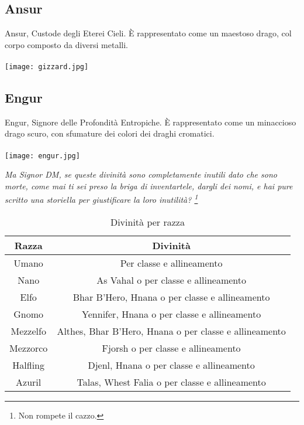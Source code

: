 \documentclass[a4paper]{report}
\begin{document}
\begin{multicols}{2}
\newpage
\subsection*{Ansur}
Ansur, Custode degli Eterei Cieli. È rappresentato come un maestoso drago, col corpo composto da diversi metalli.\\
\\
\texttt{[image: gizzard.jpg]}

\subsection*{Engur}
Engur, Signore delle Profondità Entropiche. È rappresentato come un minaccioso drago scuro, con sfumature dei colori dei draghi cromatici.\\
\\
\texttt{[image: engur.jpg]}

\vspace*{1cm}

\end{multicols}
\begin{tiny}
	\textsl{Ma Signor DM, se queste divinità sono completamente inutili dato che sono morte, come mai ti sei preso la briga di inventartele, dargli dei nomi, e hai pure scritto una storiella per giustificare la loro inutilità? \footnote{Non rompete il cazzo.}}\\
\end{tiny}

\vspace{1cm}
\begin{table}[h]
\centering
\begin{tabular}{||c|c||}
\hline
\bf	Razza & \bf Divinità\\
\hline
Umano & Per classe e allineamento\\
\hline
Nano & As Vahal o per classe e allineamento\\
\hline
Elfo & \quad \quad \quad \quad \quad \quad Bhar B'Hero, Hnana o per classe e allineamento \quad \quad \quad \quad \quad \quad\\
\hline
Gnomo & Yennifer, Hnana o per classe e allineamento\\
\hline
Mezzelfo & Althes, Bhar B'Hero, Hnana o per classe e allineamento\\
\hline 
Mezzorco & Fjorsh o per classe e allineamento\\
\hline
Halfling & Djenl, Hnana o per classe e allineamento\\
\hline
Azuril & Talas, Whest Falia o per classe e allineamento\\
\hline
\end{tabular}
\caption{Divinità per razza}
\end{table}
\end{document}
